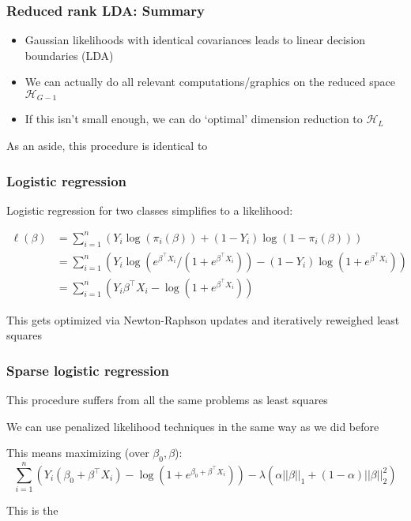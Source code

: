 \documentclass[12pt]{beamer}
\begin{document}
\begin{frame}
\frametitle{Reduced rank LDA: Summary}
\begin{itemize}
\item Gaussian likelihoods with identical covariances leads to linear decision boundaries (LDA)
\item We can actually do all relevant computations/graphics on the reduced space $\mathcal{H}_{G-1}$
\item If this isn't small enough, we can do `optimal' dimension reduction to $\mathcal{H}_L$
\end{itemize}
\vsp

As an aside, this procedure is identical to 
\end{frame}

\begin{frame}
\frametitle{Logistic regression}
Logistic regression for two classes simplifies to a likelihood:

\begin{align*}
\ell(\beta) 
& = 
\sum_{i=1}^n \left( Y_i\log(\pi_i(\beta)) + (1-Y_i)\log(1-\pi_i(\beta))\right) \\
& = 
\sum_{i=1}^n \left( Y_i\log(e^{\beta^{\top}X_i}/(1+e^{\beta^{\top}X_i})) - (1-Y_i)\log(1+e^{\beta^{\top}X_i})\right) \\
& = 
\sum_{i=1}^n \left( Y_i\beta^{\top}X_i -\log(1 + e^{\beta^{\top} X_i})\right)
\end{align*}

This gets optimized via Newton-Raphson updates and iteratively reweighed least squares
\end{frame}

\begin{frame}
\frametitle{Sparse logistic regression}
This procedure suffers from all the same problems as least squares

\vsp
We can use penalized likelihood techniques in the same way as we did before

\vsp
This means maximizing (over $\beta_0,\beta$):
\[
\sum_{i=1}^n \left( Y_i(\beta_0 + \beta^{\top}X_i) -\log(1 + e^{\beta_0 + \beta^{\top} X_i})\right)  
- \lambda (\alpha||\beta||_1+ (1-\alpha) ||\beta||_2^2)
\]

\vsp
This is the 
\end{frame}
\end{document}
